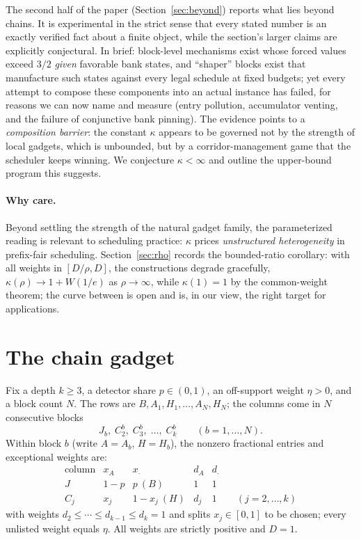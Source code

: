\documentclass[11pt]{article}
\theoremstyle{definition}
\newcommand{\W}{W}
\begin{document}
The second half of the paper (Section~\ref{sec:beyond}) reports what lies
beyond chains.  It is experimental in the strict sense that every stated
number is an exactly verified fact about a finite object, while the
section's larger claims are explicitly conjectural.  In brief: block-level
mechanisms exist whose forced values exceed $3/2$ \emph{given} favorable
bank states, and ``shaper'' blocks exist that manufacture such states
against every legal schedule at fixed budgets; yet every attempt to
compose these components into an actual instance has failed, for reasons
we can now name and measure (entry pollution, accumulator venting, and the
failure of conjunctive bank pinning).  The evidence points to a
\emph{composition barrier}: the constant $\kappa$ appears to be governed
not by the strength of local gadgets, which is unbounded, but by a
corridor-management game that the scheduler keeps winning.  We conjecture
$\kappa<\infty$ and outline the upper-bound program this suggests.

\paragraph{Why care.}
Beyond settling the strength of the natural gadget family, the
parameterized reading is relevant to scheduling practice: $\kappa$ prices
\emph{unstructured heterogeneity} in prefix-fair scheduling.
Section~\ref{sec:rho} records the bounded-ratio corollary: with all
weights in $[D/\rho, D]$, the constructions degrade gracefully,
$\kappa(\rho)\to1+\W(1/e)$ as $\rho\to\infty$, while $\kappa(1)=1$ by the
common-weight theorem; the curve between is open and is, in our view, the
right target for applications.

\section{The chain gadget}\label{sec:gadget}

Fix a depth $k\ge3$, a detector share $p\in(0,1)$, an off-support
weight $\eta>0$, and a block count $N$.  The rows are
$B,A_1,H_1,\ldots,A_N,H_N$; the columns come in $N$ consecutive blocks
\[
 J_b,\;C^b_2,\;C^b_3,\;\ldots,\;C^b_k\qquad(b=1,\ldots,N).
\]
Within block $b$ (write $A=A_b$, $H=H_b$), the nonzero fractional entries
and exceptional weights are:
\[
\begin{array}{c|cc|cc}
 \text{column} & x_A & x_{\cdot} & d_A & d_{\cdot}\\
\hline
 J   & 1-p & p\ (B) & 1 & 1\\
 C_j & x_j & 1-x_j\ (H) & d_j & 1\qquad(j=2,\ldots,k)
\end{array}
\]
with weights $d_2\le\cdots\le d_{k-1}\le d_k=1$ and splits
$x_j\in[0,1]$ to be chosen; every unlisted weight equals $\eta$.  All
weights are strictly positive and $D=1$.
\end{document}
